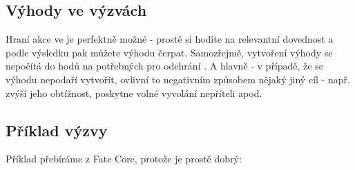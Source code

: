\documentclass[../main.tex]{subfiles}
\begin{document}
\subsection{Výhody ve výzvách}
\label{sec:výhody-výzvy}

Hraní akce  ve  je perfektně možné - prostě si hodíte na relevantní dovednost a podle výsledku pak můžete výhodu čerpat. Samozřejmě, vytvoření výhody se nepočítá do hodů na  potřebných pro odehrání . A hlavně - v případě, že se výhodu nepodaří vytvořit, ovlivní to negativním způsobem nějaký jiný cíl - např. zvýší jeho obtížnost, poskytne volné vyvolání nepříteli apod.

\subsection{Příklad výzvy}
\label{sec:příklad-výzvy}

Příklad  přebíráme z Fate Core, protože je prostě dobrý:
\end{document}
